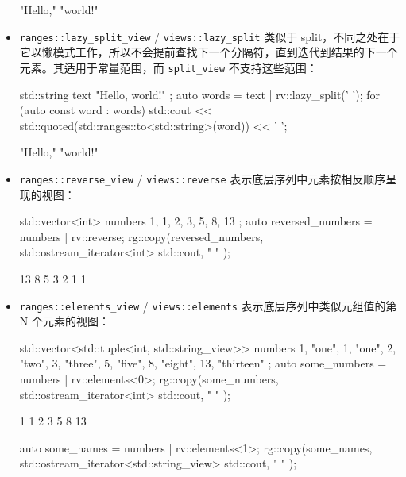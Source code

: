 \begin{itemize}
\begin{shell}
"Hello," "world!"
\end{shell}

\item
\verb|ranges::lazy_split_view| / \verb|views::lazy_split| 类似于 split，不同之处在于它以懒模式工作，所以不会提前查找下一个分隔符，直到迭代到结果的下一个元素。其适用于常量范围，而 \verb|split_view| 不支持这些范围：

\begin{cpp}
std::string text{ "Hello, world!" };
auto words = text | rv::lazy_split(' ');
for (auto const word : words)
{
    std::cout <<
        std::quoted(std::ranges::to<std::string>(word)) << ' ';
}
\end{cpp}

\begin{shell}
"Hello," "world!"
\end{shell}

\item
\verb|ranges::reverse_view| / \verb|views::reverse| 表示底层序列中元素按相反顺序呈现的视图：

\begin{cpp}
std::vector<int> numbers{ 1, 1, 2, 3, 5, 8, 13 };
auto reversed_numbers = numbers | rv::reverse;
rg::copy(reversed_numbers,
         std::ostream_iterator<int>{ std::cout, " " });
\end{cpp}

\begin{shell}
13 8 5 3 2 1 1
\end{shell}

\item
\verb|ranges::elements_view| / \verb|views::elements| 表示底层序列中类似元组值的第 N 个元素的视图：

\begin{cpp}
std::vector<std::tuple<int, std::string_view>> numbers{
    {1, "one"},
    {1, "one"},
    {2, "two"},
    {3, "three"},
    {5, "five"},
    {8, "eight"},
    {13, "thirteen"} };
auto some_numbers = numbers | rv::elements<0>;
rg::copy(some_numbers, std::ostream_iterator<int>{ std::cout, " " });
\end{cpp}

\begin{shell}
1 1 2 3 5 8 13
\end{shell}

\begin{cpp}
auto some_names = numbers | rv::elements<1>;
rg::copy(some_names,
std::ostream_iterator<std::string_view>{ std::cout, " " });
\end{cpp}


\end{itemize}
